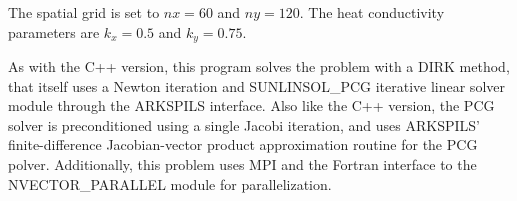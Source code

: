 \documentclass[letterpaper,10pt,english]{sphinxmanual}
\begin{document}
The spatial grid is set to \(nx=60\) and \(ny=120\).  The heat
conductivity parameters are \(k_x=0.5\) and \(k_y=0.75\).

As with the C++ version, this program solves the problem with a DIRK
method, that itself uses a Newton iteration and SUNLINSOL\_PCG
iterative linear solver module through the ARKSPILS interface.  Also
like the C++ version, the PCG solver is preconditioned using a single
Jacobi iteration, and uses ARKSPILS' finite-difference Jacobian-vector
product approximation routine for the PCG polver.  Additionally, this
problem uses MPI and the Fortran interface to the NVECTOR\_PARALLEL
module for parallelization.
\label{References:references}
\begin{thebibliography}{HSR2017}
\end{thebibliography}



\renewcommand{\indexname}{Index}
\printindex
\end{document}
